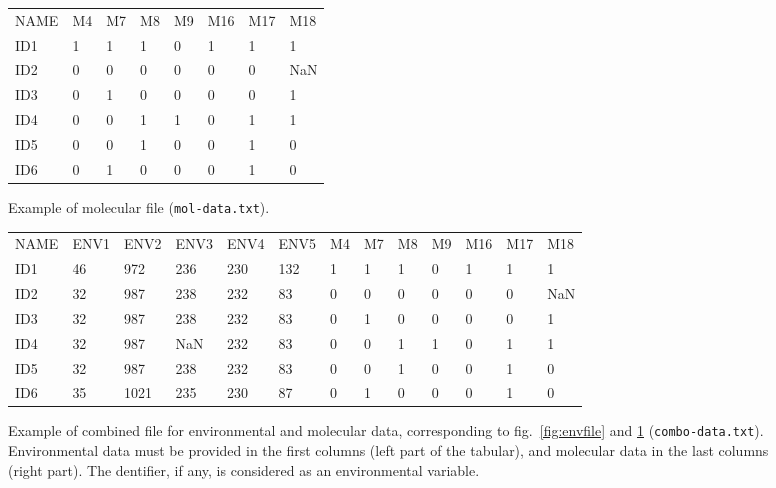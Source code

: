 \documentclass[a4paper,11pt]{article}
\begin{document}
\begin{figure}[htbp]

\begin{center}
		\begin{mdframed}[backgroundcolor=white,userdefinedwidth=10cm,align=center]
		\begin{tabular}{llllllll}
NAME&	M4	&M7	&M8	&M9	&M16	&M17	&M18\\
ID1&	 1	&1	&1	&0	&1	&1	&1\\
ID2& 0	&0	&0	&0	&0	&0	&NaN\\
ID3& 0	&1	&0	&0	&0	&0	&1\\
ID4& 0	&0	&1	&1	&0	&1	&1\\
ID5& 0	&0	&1	&0	&0	&1	&0\\
ID6& 0	&1	&0	&0	&0	&1	&0\\
		\end{tabular}
	\end{mdframed}
	\caption{Example of molecular file (\texttt{mol-data.txt}).}
	\label{fig:molfile}
	\end{center}
\end{figure}

\begin{figure}[h!]
\begin{center}
\scriptsize
		\begin{mdframed}[backgroundcolor=white,userdefinedwidth=14.5cm,align=center]
		\begin{tabular}{*{13}{l}}
NAME&	ENV1	&ENV2	&ENV3	&ENV4	&ENV5		&	M4	&M7	&M8	&M9	&M16	&M17	&M18\\
ID1	&	46	&	972	&	236	&	230	&	132	&		1	&1	&1	&0	&1	&1	&1\\
ID2	&	32	&	987	&	238	&	232	&	83	&	 0	&0	&0	&0	&0	&0	&NaN\\	
ID3	&	32	&	987	&	238	&	232	&	83	&	 0	&1	&0	&0	&0	&0	&1\\	
ID4	&	32	&	987	&	NaN	&	232	&	83	&	 0	&0	&1	&1	&0	&1	&1\\	
ID5	&	32	&	987	&	238	&	232	&	83	& 	0	&0	&1	&0	&0	&1	&0\\	
ID6	&	35	&	1021	&	235	&	230	&	87	& 	0	&1	&0	&0	&0	&1	&0\\	
		\end{tabular}
	\end{mdframed}
	\caption{Example of combined file for environmental and molecular data, corresponding to fig.~\ref{fig:envfile} and \ref{fig:molfile} (\texttt{combo-data.txt}).
	Environmental data must be provided in the first columns (left part of the tabular), and molecular data in the last columns (right part).
	The dentifier, if any, is considered as an environmental variable.}
	\label{fig:molenvfile}
	\end{center}
\end{figure}
\end{document}
